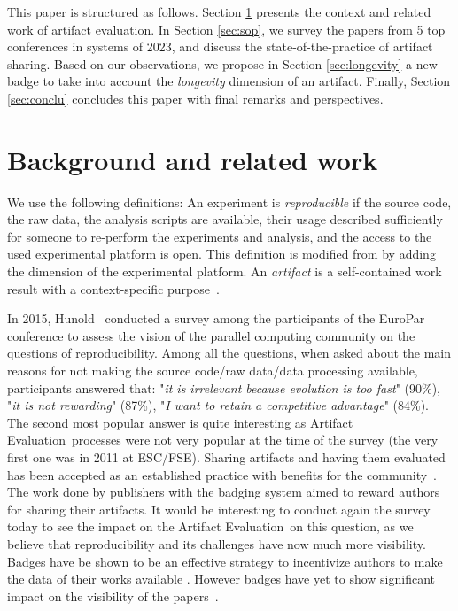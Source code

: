 \documentclass[sigconf,natbib=false]{acmart}
\newcommand{\aeval}{Artifact Evaluation}
\begin{document}
This paper is structured as follows.
Section \ref{sec:background} presents the context and related work of artifact evaluation.
In Section \ref{sec:sop}, we survey the papers from 5 top conferences in systems of 2023, and discuss the state-of-the-practice of artifact sharing.
Based on our observations, we propose in Section \ref{sec:longevity} a new badge to take into account the \emph{longevity} dimension of an artifact.
Finally, Section \ref{sec:conclu} concludes this paper with final remarks and perspectives.

%
\section{Background and related work}\label{sec:background}

We use the following definitions:
An experiment is \emph{reproducible} if the source code, the raw data, the analysis scripts are available, their usage described sufficiently for someone to re-perform the experiments and analysis, and the access to the used experimental platform is open.
This definition is modified from \cite{rougier2019rescience} by adding the dimension of the experimental platform.
An \emph{artifact} is a self-contained work result with a context-specific purpose\ \cite{mendez2019artefacts}.

In 2015, Hunold\ \cite{hunold2015survey} conducted a survey among the participants of the EuroPar conference to assess the vision of the parallel computing community on the questions of reproducibility. 
Among all the questions, when asked about the main reasons for not making the source code/raw data/data processing available, participants answered that: "\emph{it is irrelevant because evolution is too fast}" (90\%), "\emph{it is not rewarding}" (87\%), "\emph{I want to retain a competitive advantage}" (84\%).
The second most popular answer is quite interesting as \aeval\ processes were not very popular at the time of the survey (the very first one was in 2011 at ESC/FSE).
Sharing artifacts and having them evaluated has been accepted as an established practice with benefits for the community\ \cite{hermann2022has}.
The work done by publishers with the badging system aimed to reward authors for sharing their artifacts.
It would be interesting to conduct again the survey today to see the impact on the \aeval\ on this question, as we believe that reproducibility and its challenges have now much more visibility.
Badges have be shown to be an effective strategy to incentivize authors to make the data of their works available \cite{kidwell2016badges, rowhani2017incentives}.
However badges have yet to show significant impact on the visibility of the papers\ \cite{winter2022retrospective, frachtenberg2022research, heumuller2020publish}. 
\end{document}
